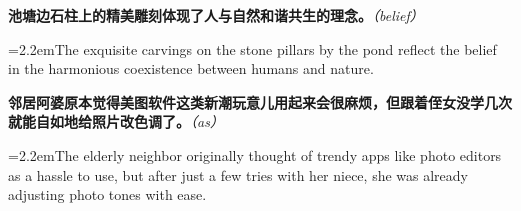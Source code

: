 \documentclass[11pt,a4paper]{article}
\newcommand{\num}[1]{\makebox[1.9em][r]{#1.}\hspace{0.3em}}
\newcommand{\prompt}[1]{\emph{\textcolor{tipblue}{\small（#1）}}}
\begin{document}
\begin{minipage}{\linewidth}

\num{23}\textbf{池塘边石柱上的精美雕刻体现了人与自然和谐共生的理念。}\prompt{belief}

\vspace{0.15em}

\noindent\hangindent=2.2em\hspace{2.2em}The exquisite carvings on the stone pillars by the pond reflect the belief in the harmonious coexistence between humans and nature.

\end{minipage}

\begin{minipage}{\linewidth}

\num{24}\textbf{邻居阿婆原本觉得美图软件这类新潮玩意儿用起来会很麻烦，但跟着侄女没学几次就能自如地给照片改色调了。}\prompt{as}

\vspace{0.15em}

\noindent\hangindent=2.2em\hspace{2.2em}The elderly neighbor originally thought of trendy apps like photo editors as a hassle to use, but after just a few tries with her niece, she was already adjusting photo tones with ease.

\end{minipage}
\end{document}
